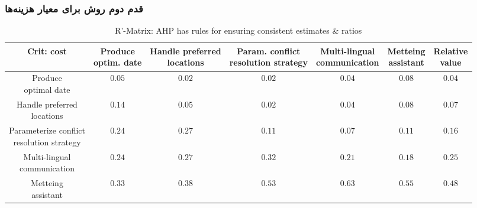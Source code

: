 \subsubsection{قدم دوم روش  برای معیار هزینه‌ها}

\begin{LTR}
    \begin{table}[H]
        \centering
        \begin{tabular}{ccccccc} Crit: cost & \makecell{Produce \\ optim. date} & \makecell{Handle preferred \\ locations} & \makecell{Param. conflict \\ resolution strategy} & \makecell{Multi-lingual \\ communication} & \makecell{Metteing \\ assistant} & \makecell{Relative \\ value} \\ \hline
            \makecell{Produce \\ optimal date} & $0.05$ & $0.02$ & $0.02$ & $0.04$ & $0.08$ & $0.04$ \\ \hline
            \makecell{Handle preferred \\ locations} & $0.14$ & $0.05$ & $0.02$ & $0.04$ & $0.08$ & $0.07$ \\ \hline
            \makecell{Parameterize conflict \\ resolution strategy} & $0.24$ & $0.27$ & $0.11$ & $0.07$ & $0.11$ & $0.16$ \\ \hline
            \makecell{Multi-lingual \\ communication} & $0.24$ & $0.27$ & $0.32$ & $0.21$ & $0.18$ & $0.25$ \\ \hline
            \makecell{Metteing \\ assistant} & $0.33$ & $0.38$ & $0.53$ & $0.63$ & $0.55$ & $0.48$ \\
        \end{tabular}
        \caption{R'-Matrix: AHP has rules for ensuring consistent estimates \&
        ratios}
        \label{fig:ahpCostStep2}
    \end{table}
\end{LTR}